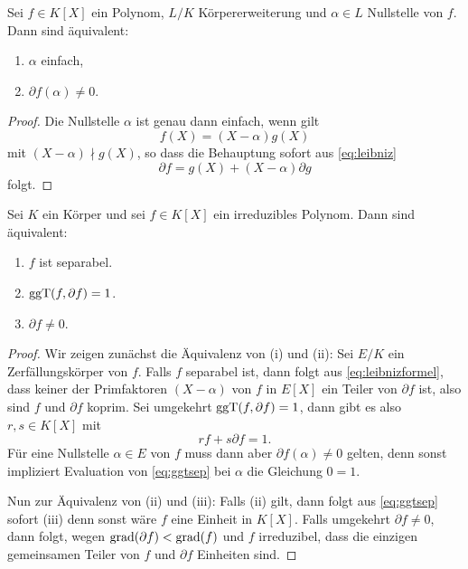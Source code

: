 \documentclass{book}
\begin{document}
\begin{lem}
    \label{lem:kritsimp}
    Sei $f \in K[X]$ ein Polynom, $L/K$ Körpererweiterung und $\alpha \in L$
    Nullstelle von $f$. Dann sind äquivalent:
    \begin{enumerate}[label=(\roman{*})]
        \item $\alpha$ einfach,
        \item $\partial f (\alpha) \neq 0$.
    \end{enumerate}
\end{lem}
\begin{proof}
    Die Nullstelle $\alpha$ ist genau dann einfach, wenn gilt
    \[
        f(X) = (X-\alpha)g(X)
    \]
    mit $(X-\alpha) \nmid g(X)$, so dass die Behauptung sofort aus \eqref{eq:leibniz}
    \begin{equation}
        \label{eq:leibnizformel}
            \partial f = g(X) + (X-\alpha) \partial g
    \end{equation}
    folgt. 
\end{proof}

\begin{prop} \label{prop:irredsep} Sei $K$ ein Körper und sei $f \in K[X]$ ein
    irreduzibles Polynom. Dann sind äquivalent:
    \begin{enumerate}[label=(\roman *)]
        \item $f$ ist separabel.
        \item $\operatorname{ggT}(f, \partial f) = 1$.
        \item $\partial f \neq 0$.
    \end{enumerate}
\end{prop}
\begin{proof}
    Wir zeigen zunächst die Äquivalenz von (i) und (ii): 
    Sei $E/K$ ein Zerfällungskörper von $f$. Falls $f$ separabel ist, dann
    folgt aus \eqref{eq:leibnizformel}, dass keiner der Primfaktoren
    $(X-\alpha)$ von $f$ in $E[X]$ ein Teiler von $\partial f$ ist, also sind
    $f$ und $\partial f$ koprim.
    Sei umgekehrt $\operatorname{ggT}(f, \partial f) = 1$, dann gibt es also $r,s \in K[X]$ mit
    \begin{equation}
        \label{eq:ggtsep}
        rf + s\partial f = 1.
    \end{equation}
    Für eine Nullstelle $\alpha \in E$ von $f$ muss dann aber $\partial f (\alpha) \neq 0$
    gelten, denn sonst impliziert Evaluation von \eqref{eq:ggtsep} bei $\alpha$
    die Gleichung $0 = 1$. 

    Nun zur Äquivalenz von (ii) und (iii): Falls (ii) gilt, dann folgt aus
    \eqref{eq:ggtsep} sofort (iii) denn sonst wäre $f$ eine Einheit in $K[X]$.
    Falls umgekehrt $\partial f \neq 0$, dann folgt, wegen $\operatorname{grad}(\partial f)
    < \operatorname{grad}(f)$ und $f$ irreduzibel, dass die einzigen gemeinsamen Teiler von
    $f$ und $\partial f$ Einheiten sind. 
\end{proof}
\end{document}
